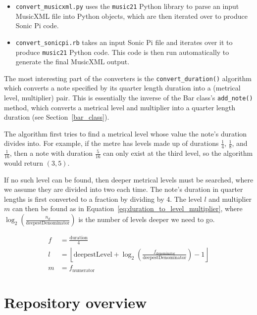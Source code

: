 \documentclass[12pt,twoside,openright]{report}
\begin{document}
\begin{itemize}
	\item \verb'convert_musicxml.py' uses the \verb'music21' Python library to parse an input MusicXML file into Python objects, which are then iterated over to produce Sonic Pi code.
	\item \verb'convert_sonicpi.rb' takes an input Sonic Pi file and iterates over it to produce \verb'music21' Python code. This code is then run automatically to generate the final MusicXML output.
\end{itemize}

The most interesting part of the converters is the \verb'convert_duration()' algorithm
which converts a note specified by its quarter length duration into a (metrical
level, multiplier) pair. This is essentially the inverse of the Bar class's
\verb'add_note()' method, which converts a metrical level and multiplier into a quarter length duration (see Section~\ref{bar_class}).

The algorithm first tries to find a metrical
level whose value the note's duration divides into. For example, if the metre
has levels made up of durations $\frac{1}{4}$, $\frac{1}{8}$, and $\frac{1}{16}$, then a note with duration $\frac{5}{16}$
can only exist at the third level, so the algorithm would return $(3,5)$.

If no
such level can be found, then deeper metrical levels must be searched, where we
assume they are divided into two each time. The note's duration in quarter
lengths is first converted to a fraction by dividing by 4. The level $l$ and
multiplier $m$ can then be found as in Equation~\ref{eq:duration_to_level_multiplier}, where $\log_2\left(\frac{n_d}{\mathrm{deepestDenominator}}\right)$ is the number of levels deeper we need to go.

\begin{equation}
    \begin{split}
        f &= \frac{\mathrm{duration}}{4} \\
        l &= \left\lfloor \mathrm{deepestLevel} + \log_2\left(\frac{f_\mathrm{denominator}}{\mathrm{deepestDenominator}}\right) - 1 \right\rfloor  \\
        m &= f_\mathrm{numerator}
    \end{split}
    \label{eq:duration_to_level_multiplier}
\end{equation}
\newpage



\section{Repository overview} \label{repository}
\end{document}
